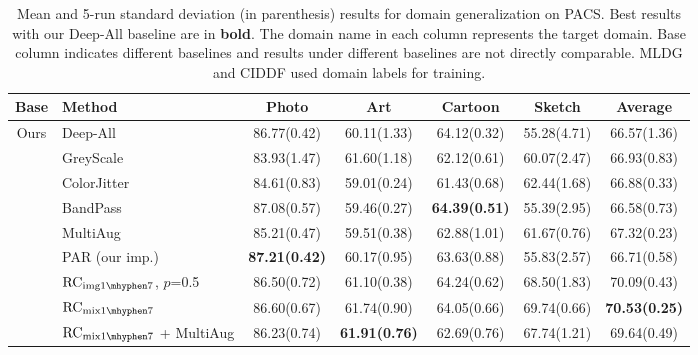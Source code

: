 \documentclass{article} \usepackage{iclr2021_conference,times}
\begin{document}
\begin{table}[t]
	\small
	\caption{Mean and 5-run standard deviation (in parenthesis) results for domain generalization on PACS. Best results with our Deep-All baseline are in \textbf{bold}. The  domain name in each column represents the target domain. {Base column indicates different baselines and results under different baselines are not directly comparable. MLDG and CIDDF used domain labels for training.}}
	\label{table:PACS}
	\centering
	\begin{tabular}{c|lccccc}
		\toprule
		Base & Method & Photo & Art & Cartoon & Sketch & Average \\
		\toprule
		\multirow{10}{*}{\centering Ours}& Deep-All     & 86.77\tiny(0.42) & 60.11\tiny(1.33) & 64.12\tiny(0.32) & 55.28\tiny(4.71) & 66.57\tiny(1.36) \\
		
		& GreyScale        & 83.93\tiny(1.47) & 61.60\tiny(1.18) & 62.12\tiny(0.61) & 60.07\tiny(2.47) & 66.93\tiny(0.83) \\
		
		& ColorJitter & 84.61\tiny(0.83) & 59.01\tiny(0.24) & 61.43\tiny(0.68) & 62.44\tiny(1.68) & 66.88\tiny(0.33) \\
		
		&{BandPass} & 87.08\tiny(0.57) & 	59.46\tiny(0.27)	& \textbf{64.39\tiny(0.51)}	& 55.39\tiny(2.95)&	66.58\tiny(0.73) \\
		
		&{MultiAug} & 85.21\tiny(0.47)	& 59.51\tiny(0.38)&	62.88\tiny(1.01)&	61.67\tiny(0.76)&	67.32\tiny(0.23) \\
		
		&PAR (our imp.) & \textbf{87.21\tiny(0.42)} & 60.17\tiny(0.95)  & 63.63\tiny(0.88)  & 55.83\tiny(2.57) & 66.71\tiny(0.58)\\
		\cmidrule{2-7}
		
&$\text{RC}_{\text{img}{1\mhyphen7}}$\tiny, $p$=0.5 & 86.50\tiny(0.72) & 61.10\tiny(0.38) &  {64.24\tiny(0.62)} & 68.50\tiny(1.83) & 70.09\tiny(0.43) \\
		
		&$\text{RC}_{\text{mix}{1\mhyphen7}}$ & 86.60\tiny(0.67) &  {61.74\tiny(0.90)} & 64.05\tiny(0.66) & 69.74\tiny(0.66) &  \textbf{70.53\tiny(0.25)} \\
		
		& {$\text{RC}_{\text{mix}{1\mhyphen7}}$ + \scriptsize MultiAug } & 86.23\tiny(0.74)&	\textbf{61.91\tiny(0.76)}&	62.69\tiny(0.76)&	67.74\tiny(1.21)&	69.64\tiny(0.49) \\
		

\end{tabular}
\end{table}
\end{document}
